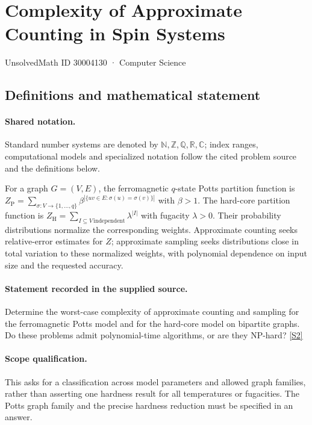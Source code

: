 \documentclass[11pt]{article}
\newcommand{\sref}[2]{\hyperlink{source:#1:#2}{[S#2]}}
\begin{document}
\setcounter{section}{30004129}
\section{Complexity of Approximate Counting in Spin Systems}\label{30004130}
{\small\sffamily UnsolvedMath ID 30004130 · Computer Science}
\subsection{Definitions and mathematical statement}

\paragraph{Shared notation.}Standard number systems are denoted by $\mathbb N,\mathbb Z,\mathbb Q,\mathbb R,\mathbb C$; index ranges, computational models and specialized notation follow the cited problem source and the definitions below.


For a graph $G=(V,E)$, the ferromagnetic $q$-state Potts partition function is $Z_{\mathrm P}=\sum_{\sigma:V\to\{1,\ldots,q\}}\beta^{|\{uv\in E:\sigma(u)=\sigma(v)\}|}$ with $\beta>1$. The hard-core partition function is $Z_{\mathrm H}=\sum_{I\subseteq V\,\mathrm{independent}}\lambda^{|I|}$ with fugacity $\lambda>0$. Their probability distributions normalize the corresponding weights. Approximate counting seeks relative-error estimates for $Z$; approximate sampling seeks distributions close in total variation to these normalized weights, with polynomial dependence on input size and the requested accuracy.
\paragraph{Statement recorded in the supplied source.}
Determine the worst-case complexity of approximate counting and sampling for the ferromagnetic Potts model and for the hard-core model on bipartite graphs. Do these problems admit polynomial-time algorithms, or are they NP-hard? \sref{30004130}{2}
\paragraph{Scope qualification.}
This asks for a classification across model parameters and allowed graph families, rather than asserting one hardness result for all temperatures or fugacities. The Potts graph family and the precise hardness reduction must be specified in an answer.
\end{document}
